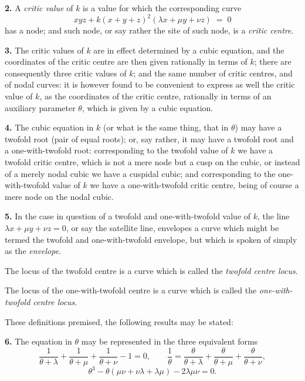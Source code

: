 \documentclass[11pt,a4paper]{article}
\begin{document}
\medskip

\textbf{2.} A \emph{critic value} of $k$ is a value for which the corresponding curve
\[
xyz + k(x + y + z)^2(\lambda x + \mu y + \nu z) \;=\; 0
\]
has a node; and such node, or say rather the site of such node, is a \emph{critic centre}.

\medskip

\textbf{3.} The critic values of $k$ are in effect determined by a cubic equation, and the coordinates of the critic centre are then given rationally in terms of $k$; there are consequently three critic values of $k$; and the same number of critic centres, and of nodal curves: it is however found to be convenient to express as well the critic value of $k$, as the coordinates of the critic centre, rationally in terms of an auxiliary parameter $\theta$, which is given by a cubic equation.

\medskip

\textbf{4.} The cubic equation in $k$ (or what is the same thing, that in $\theta$) may have a twofold root (pair of equal roots); or, say rather, it may have a twofold root and a one-with-twofold root: corresponding to the twofold value of $k$ we have a twofold critic centre, which is not a mere node but a cusp on the cubic, or instead of a merely nodal cubic we have a cuspidal cubic; and corresponding to the one-with-twofold value of $k$ we have a one-with-twofold critic centre, being of course a mere node on the nodal cubic.

\medskip

\textbf{5.} In the case in question of a twofold and one-with-twofold value of $k$, the line $\lambda x + \mu y + \nu z = 0$, or say the satellite line, envelopes a curve which might be termed the twofold and one-with-twofold envelope, but which is spoken of simply as the \emph{envelope}.

The locus of the twofold centre is a curve which is called the \emph{twofold centre locus}.

The locus of the one-with-twofold centre is a curve which is called the \emph{one-with-twofold centre locus}.

These definitions premised, the following results may be stated:

\medskip

\textbf{6.} The equation in $\theta$ may be represented in the three equivalent forms
\[
\frac{1}{\theta + \lambda} + \frac{1}{\theta + \mu} + \frac{1}{\theta + \nu} - 1 = 0,\qquad \frac{1}{\theta} = \frac{\theta}{\theta + \lambda} + \frac{\theta}{\theta + \mu} + \frac{\theta}{\theta + \nu},
\]
\[
\theta^3 - \theta(\mu\nu + \nu\lambda + \lambda\mu) - 2\lambda\mu\nu = 0.
\]
\end{document}
